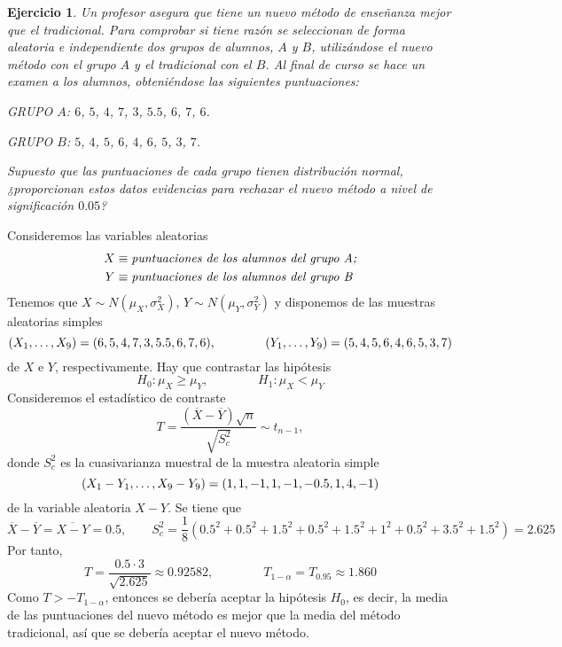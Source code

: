 \documentclass[11pt]{report}
\makeatletter
\renewenvironment{proof}[1][\proofname]{\par
  \pushQED{\qed}%
  \normalfont \topsep\z@skip %
  \trivlist
  \item[\hskip\labelsep
        \itshape
    #1\@addpunct{.}]\ignorespaces
}{%
  \popQED\endtrivlist\@endpefalse
}
\newtheorem{ejercicio}{Ejercicio}
\makeatother
\begin{document}
\begin{ejercicio}
  Un profesor asegura que tiene un nuevo método de enseñanza mejor que el tradicional. Para comprobar si tiene razón se seleccionan de forma aleatoria e independiente dos grupos de alumnos, $A$ y $B$, utilizándose el nuevo método con el grupo $A$ y el tradicional con el $B$. Al final de curso se hace un examen a los alumnos, obteniéndose las siguientes puntuaciones:

  GRUPO $A$: $6$, $5$, $4$, $7$, $3$, $5.5$, $6$, $7$, $6$.

  GRUPO $B$: $5$, $4$, $5$, $6$, $4$, $6$, $5$, $3$, $7$.

  Supuesto que las puntuaciones de cada grupo tienen distribución normal, ¿proporcionan estos datos evidencias para rechazar el nuevo método a nivel de significación $0.05$?
\end{ejercicio}

\begin{proof}
  Consideremos las variables aleatorias
  \[\begin{aligned}[t]
    X &\equiv \textup{\emph{puntuaciones de los alumnos del grupo A;}} \\
    Y &\equiv \textup{\emph{puntuaciones de los alumnos del grupo B}}
  \end{aligned}\]
  Tenemos que $X \sim N(\mu_X,\sigma_X^2)$, $Y \sim N(\mu_Y, \sigma_Y^2)$ y disponemos de las muestras aleatorias simples 
  \[(X_1,\mathellipsis,X_9) = (6, 5, 4, 7, 3, 5.5, 6, 7, 6), \qquad \qquad (Y_1,\mathellipsis,Y_9) = (5, 4, 5, 6, 4, 6, 5, 3, 7)\]
  de $X$ e $Y$, respectivamente. Hay que contrastar las hipótesis
  \[H_0 \colon \mu_X \geq \mu_Y, \qquad \qquad H_1 \colon \mu_X < \mu_Y\]
  Consideremos el estadístico de contraste
  \[T = \frac{(\overline{X}-\overline{Y})\sqrt{n}}{\sqrt{S^2_c}} \sim t_{n-1},\]
  donde $S^2_c$ es la cuasivarianza muestral de la muestra aleatoria simple
  \[(X_1-Y_1,\mathellipsis,X_9-Y_9) = (1,1,-1,1,-1,-0.5,1,4,-1)\]
  de la variable aleatoria $X-Y$. Se tiene que
  \[\overline{X}-\overline{Y} = \overline{X-Y} =0.5, \qquad S^2_c = \frac{1}{8}\left(0.5^2+0.5^2+1.5^2+0.5^2+1.5^2+1^2+0.5^2+3.5^2+1.5^2\right)=2.625\]
  Por tanto,
  \[T = \frac{0.5 \cdot 3}{\sqrt{2.625}} \approx 0.92582, \qquad \qquad T_{1-\alpha} = T_{0.95} \approx1.860\]
  Como $T > -T_{1-\alpha}$, entonces se debería aceptar la hipótesis $H_0$, es decir, la media de las puntuaciones del nuevo método es mejor que la media del método tradicional, así que se debería aceptar el nuevo método.
\end{proof}
\end{document}
